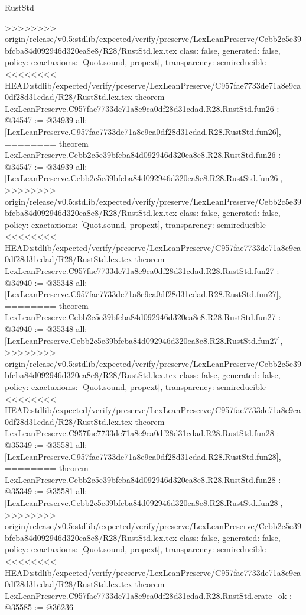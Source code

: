 \begin{lexlean}{RustStd}
\begin{coremodule}
{\begin{coremodule}
{{{{{{{{{{{{{{{{{{{{{{{{{{{{{>>>>>>>> origin/release/v0.5:stdlib/expected/verify/preserve/LexLeanPreserve/Cebb2c5e39bfcba84d092946d320ea8e8/R28/RustStd.lex.tex
  class: false,
  generated: false,
  policy: exact{axioms: [Quot.sound, propext]},
  transparency: semireducible
}
<<<<<<<< HEAD:stdlib/expected/verify/preserve/LexLeanPreserve/C957fae7733de71a8e9ca0df28d31cdad/R28/RustStd.lex.tex
theorem LexLeanPreserve.C957fae7733de71a8e9ca0df28d31cdad.R28.RustStd.fun26 : @34547 := @34939 {
  all: [LexLeanPreserve.C957fae7733de71a8e9ca0df28d31cdad.R28.RustStd.fun26],
========
theorem LexLeanPreserve.Cebb2c5e39bfcba84d092946d320ea8e8.R28.RustStd.fun26 : @34547 := @34939 {
  all: [LexLeanPreserve.Cebb2c5e39bfcba84d092946d320ea8e8.R28.RustStd.fun26],
>>>>>>>> origin/release/v0.5:stdlib/expected/verify/preserve/LexLeanPreserve/Cebb2c5e39bfcba84d092946d320ea8e8/R28/RustStd.lex.tex
  class: false,
  generated: false,
  policy: exact{axioms: [Quot.sound, propext]},
  transparency: semireducible
}
<<<<<<<< HEAD:stdlib/expected/verify/preserve/LexLeanPreserve/C957fae7733de71a8e9ca0df28d31cdad/R28/RustStd.lex.tex
theorem LexLeanPreserve.C957fae7733de71a8e9ca0df28d31cdad.R28.RustStd.fun27 : @34940 := @35348 {
  all: [LexLeanPreserve.C957fae7733de71a8e9ca0df28d31cdad.R28.RustStd.fun27],
========
theorem LexLeanPreserve.Cebb2c5e39bfcba84d092946d320ea8e8.R28.RustStd.fun27 : @34940 := @35348 {
  all: [LexLeanPreserve.Cebb2c5e39bfcba84d092946d320ea8e8.R28.RustStd.fun27],
>>>>>>>> origin/release/v0.5:stdlib/expected/verify/preserve/LexLeanPreserve/Cebb2c5e39bfcba84d092946d320ea8e8/R28/RustStd.lex.tex
  class: false,
  generated: false,
  policy: exact{axioms: [Quot.sound, propext]},
  transparency: semireducible
}
<<<<<<<< HEAD:stdlib/expected/verify/preserve/LexLeanPreserve/C957fae7733de71a8e9ca0df28d31cdad/R28/RustStd.lex.tex
theorem LexLeanPreserve.C957fae7733de71a8e9ca0df28d31cdad.R28.RustStd.fun28 : @35349 := @35581 {
  all: [LexLeanPreserve.C957fae7733de71a8e9ca0df28d31cdad.R28.RustStd.fun28],
========
theorem LexLeanPreserve.Cebb2c5e39bfcba84d092946d320ea8e8.R28.RustStd.fun28 : @35349 := @35581 {
  all: [LexLeanPreserve.Cebb2c5e39bfcba84d092946d320ea8e8.R28.RustStd.fun28],
>>>>>>>> origin/release/v0.5:stdlib/expected/verify/preserve/LexLeanPreserve/Cebb2c5e39bfcba84d092946d320ea8e8/R28/RustStd.lex.tex
  class: false,
  generated: false,
  policy: exact{axioms: [Quot.sound, propext]},
  transparency: semireducible
}
<<<<<<<< HEAD:stdlib/expected/verify/preserve/LexLeanPreserve/C957fae7733de71a8e9ca0df28d31cdad/R28/RustStd.lex.tex
theorem LexLeanPreserve.C957fae7733de71a8e9ca0df28d31cdad.R28.RustStd.crate_ok : @35585 := @36236 {
}}}}}}}}}}}}}}}}}}}}}}}}}}}}}}}}
\end{coremodule}}
\end{coremodule}
\end{lexlean}
